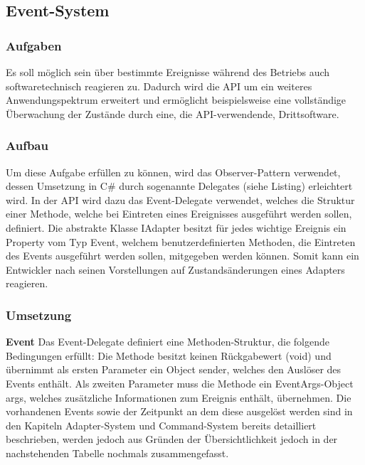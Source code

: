 
\subsection{Event-System}

\subsubsection{Aufgaben}
Es soll möglich sein über bestimmte Ereignisse während des Betriebs auch softwaretechnisch reagieren zu. Dadurch wird die API um ein weiteres Anwendungspektrum erweitert und ermöglicht beispielsweise eine vollständige Überwachung der Zustände durch eine, die API-verwendende, Drittsoftware.

\subsubsection{Aufbau}
Um diese Aufgabe erfüllen zu können, wird das Observer-Pattern verwendet, dessen Umsetzung in C\# durch sogenannte Delegates (siehe Listing) erleichtert wird. In der API wird dazu das Event-Delegate verwendet, welches die Struktur einer Methode, welche bei Eintreten eines Ereignisses ausgeführt werden sollen, definiert. 
\newline
Die abstrakte Klasse IAdapter besitzt für jedes wichtige Ereignis ein Property vom Typ Event, welchem benutzerdefinierten Methoden, die Eintreten des Events ausgeführt werden sollen, mitgegeben werden können. Somit kann ein Entwickler nach seinen Vorstellungen auf Zustandsänderungen eines Adapters reagieren.

\subsubsection{Umsetzung}
\textbf{Event}
\newline
Das Event-Delegate definiert eine Methoden-Struktur, die folgende Bedingungen erfüllt:
\newline
Die Methode besitzt keinen Rückgabewert (void) und übernimmt als ersten Parameter ein Object sender, welches den Auslöser des Events enthält. Als zweiten Parameter muss die Methode ein EventArgs-Object args, welches zusätzliche Informationen zum Ereignis enthält, übernehmen.
\newline
Die vorhandenen Events sowie der Zeitpunkt an dem diese ausgelöst werden sind in den Kapiteln Adapter-System und Command-System bereits detailliert beschrieben, werden jedoch aus Gründen der Übersichtlichkeit jedoch in der nachstehenden Tabelle nochmals zusammengefasst.

